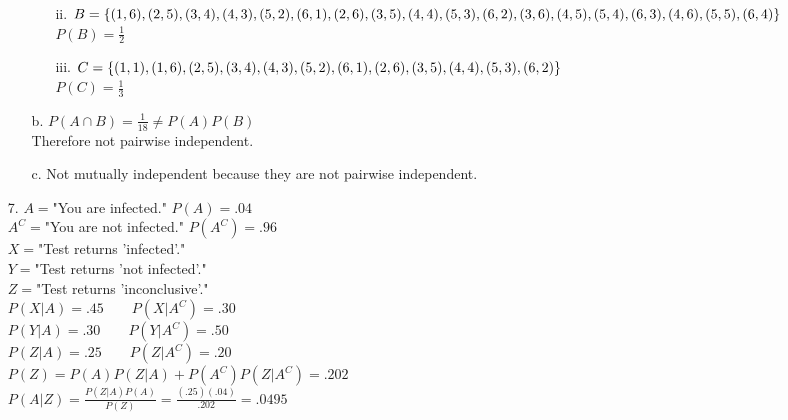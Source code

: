 \documentclass[11pt]{amsart}
\theoremstyle{definition}
\begin{document}
\begin{itemize}
\begin{itemize}
\begin{itemize}
        \item[ii.] $B=\{(1,6),(2,5),(3,4),(4,3),(5,2),(6,1),(2,6),(3,5),\\(4,4),(5,3),(6,2),(3,6),(4,5),(5,4),(6,3),(4,6),(5,5),(6,4)\}$ \\
                   $P(B)=\frac 12$

        \item[iii.] $C=\{(1,1),(1,6),(2,5),(3,4),(4,3),(5,2),(6,1),(2,6),\\(3,5),(4,4),(5,3),(6,2)\}$ \\
                    $P(C)=\frac 13$
        
    \end{itemize}

    \item[b.] $P(A\cap B)=\frac 1{18}\ne P(A)P(B)$ \\
        Therefore not pairwise independent.

    \item[c.] Not mutually independent because they are not pairwise independent.
    
\end{itemize}

\item[7.] $A=$"You are infected."   $P(A)=.04$\\
          $A^C=$"You are not infected."   $P(A^C)=.96$\\
          $X=$"Test returns 'infected'." \\
          $Y=$"Test returns 'not infected'." \\
          $Z=$"Test returns 'inconclusive'." \\
          $P(X|A)=.45\qquad P(X|A^C)=.30$ \\
          $P(Y|A)=.30\qquad P(Y|A^C)=.50$ \\
          $P(Z|A)=.25\qquad P(Z|A^C)=.20$ \\
          $P(Z)=P(A)P(Z|A)+P(A^C)P(Z|A^C)=.202$ \\
          $P(A|Z)=\frac{P(Z|A)P(A)}{P(Z)}=\frac{(.25)(.04)}{.202}=.0495$

\end{itemize}
\end{document}
